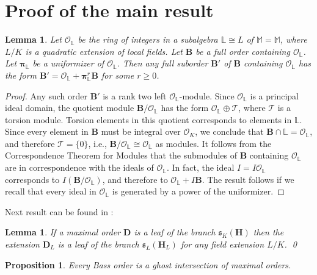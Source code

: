 \documentclass{amsart}
\newtheorem{lemma}[theorem]{Lemma}     %
\newtheorem{proposition}[theorem]{Proposition}
\theoremstyle{definition}
\newcommand\lu{\mathbb{L}}
\newcommand\alge{\mathbb{M}}
\newcommand\oink{\mathcal O}
\newcommand\Ba{\mathbf B}
\newcommand\Da{\mathbf{D}}
\newcommand\Ha{\mathbf{H}}
\begin{document}
\section{Proof of the main result}





\begin{lemma}\label{l43n}
Let $\mathcal{O}_\lu$ be the ring of 
integers in a subalgebra $\lu\cong L$
of $\alge=\alge $, where $L/K$ is a 
quadratic extension of local fields.
Let $\Ba$ be a full order containing 
$\mathcal{O}_\lu$. Let
$\boldsymbol{\pi}_\lu$ be a uniformizer
of $\mathcal{O}_\lu$.
Then any full suborder $\Ba'$ of $\Ba$ containing 
$\mathcal{O}_\lu$ has the form $\Ba'=
\mathcal{O}_\lu+\boldsymbol{\pi}_\lu^r\Ba$
for some $r\geq0$.
\end{lemma}

\begin{proof}
    Any such order $\Ba'$ is a rank two left
    $\mathcal{O}_\lu$-module. Since
    $\mathcal{O}_\lu$ is a principal ideal domain, the quotient module
    $\Ba/\mathcal{O}_\lu$ has the form
    $\mathcal{O}_\lu\oplus\mathcal{T}$,
    where $\mathcal{T}$ is a torsion module.
    Torsion elements in this quotient corresponds
    to elements in $\lu$. Since every element in $\Ba$ must be integral over 
    $\mathcal{O}_K$, we conclude that
    $\Ba\cap\lu=\oink_{\lu}$, and therefore $\mathcal{T}=
    \{0\}$, i.e., $\Ba/\mathcal{O}_\lu
    \cong\mathcal{O}_\lu$ as modules.
    It follows from the Correspondence Theorem
    for Modules that the submodules of $\Ba$
    containing $\mathcal{O}_\lu$ are
    in correspondence with the ideals of
    $\mathcal{O}_\lu$. In fact,
    the ideal $I=I\mathcal{O}_\lu$
    corresponds to 
    $I(\Ba/\mathcal{O}_\lu)$, and therefore to $\mathcal{O}_\lu+I\Ba$. The result follows if we recall that
    every ideal in $\mathcal{O}_\lu$
    is generated by a power of the uniformizer.
\end{proof}

Next result can be found in 
\cite[Cor. 3.2]{GB1}:

\begin{lemma}\label{c3x}
    If a maximal order $\Da$ is a leaf of the branch $\mathfrak{s}_K(\Ha)$ then the extension
    $\Da_L$ is a leaf of the branch 
    $\mathfrak{s}_L(\Ha_L)$ for any field extension
    $L/K$.   \qed 
\end{lemma}


\begin{proposition}\label{p45}
    Every Bass order is a ghost intersection of maximal orders.
\end{proposition}
\end{document}
